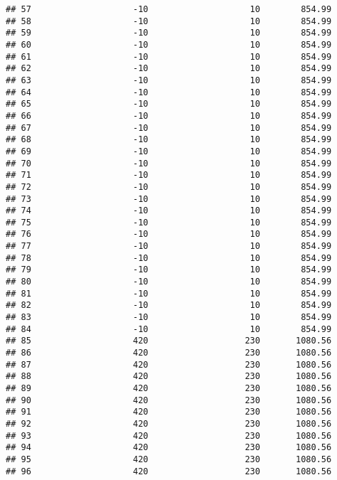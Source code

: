 \documentclass[]{article}
\begin{document}
\begin{verbatim}
## 57                    -10                    10        854.99
## 58                    -10                    10        854.99
## 59                    -10                    10        854.99
## 60                    -10                    10        854.99
## 61                    -10                    10        854.99
## 62                    -10                    10        854.99
## 63                    -10                    10        854.99
## 64                    -10                    10        854.99
## 65                    -10                    10        854.99
## 66                    -10                    10        854.99
## 67                    -10                    10        854.99
## 68                    -10                    10        854.99
## 69                    -10                    10        854.99
## 70                    -10                    10        854.99
## 71                    -10                    10        854.99
## 72                    -10                    10        854.99
## 73                    -10                    10        854.99
## 74                    -10                    10        854.99
## 75                    -10                    10        854.99
## 76                    -10                    10        854.99
## 77                    -10                    10        854.99
## 78                    -10                    10        854.99
## 79                    -10                    10        854.99
## 80                    -10                    10        854.99
## 81                    -10                    10        854.99
## 82                    -10                    10        854.99
## 83                    -10                    10        854.99
## 84                    -10                    10        854.99
## 85                    420                   230       1080.56
## 86                    420                   230       1080.56
## 87                    420                   230       1080.56
## 88                    420                   230       1080.56
## 89                    420                   230       1080.56
## 90                    420                   230       1080.56
## 91                    420                   230       1080.56
## 92                    420                   230       1080.56
## 93                    420                   230       1080.56
## 94                    420                   230       1080.56
## 95                    420                   230       1080.56
## 96                    420                   230       1080.56

\end{verbatim}
\end{document}
